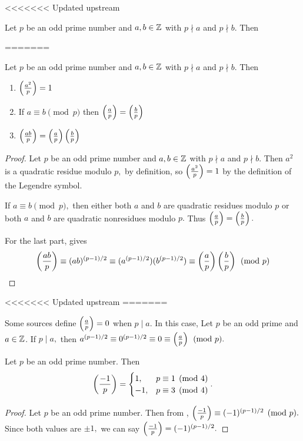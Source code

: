 \documentclass{ximera}
\begin{document}
<<<<<<< Updated upstream
\begin{proposition}[Proposition 4.5]\label{prop:legendre-facts}
	Let $p$ be an odd prime number and $a,b\in\mathbb Z$ with $p\nmid a$ and $p\nmid b.$ Then 
	\begin{enumerate}[label=(\alph*)]
=======
\begin{proposition}\label{prop:legendre-facts}
	Let $p$ be an odd prime number and $a,b\in\mathbb Z$ with $p\nmid a$ and $p\nmid b.$ Then 
	\begin{enumerate}
>>>>>>> Stashed changes
		\item $\left(\frac{a^2}{p}\right)=1$ \label{squares-are-square}
		\item If $a\equiv b\pmod{p}$ then $\left(\frac{a}{p}\right)=\left(\frac{b}{p}\right)$ \label{legendre-respects-mod}
		\item $\left(\frac{ab}{p}\right)=\left(\frac{a}{p}\right)\left(\frac{b}{p}\right)$ \label{legendre-mult}
	\end{enumerate}
\end{proposition}


\begin{proof}
    Let $p$ be an odd prime number and $a,b\in\mathbb Z$ with $p\nmid a$ and $p\nmid b.$ Then $a^2$ is a quadratic residue modulo $p,$ by definition, so $\left(\frac{a^2}{p}\right)=1$ by the definition of the Legendre symbol.

    If $a\equiv b\pmod{p},$ then either both $a$ and $b$ are quadratic residues modulo $p$ or both $a$ and $b$ are quadratic nonresidues modulo $p.$ Thus $\left(\frac{a}{p}\right)=\left(\frac{b}{p}\right).$

    For the last part,  gives \[\left(\frac{ab}{p}\right)\equiv (ab)^{(p-1)/2}\equiv (a^{(p-1)/2})(b^{(p-1)/2})\equiv \left(\frac{a}{p}\right)\left(\frac{b}{p}\right)\pmod{p}\]
\end{proof}

<<<<<<< Updated upstream
=======
\begin{remark}
	Some sources define $\left(\frac{a}{p}\right)=0$ when $p\mid a.$ In this case,  Let $p$ be an odd prime and $a\in\mathbb Z$.
	If $p\mid a,$ then $a^{(p-1)/2}\equiv 0^{(p-1)/2}\equiv 0\equiv\left(\frac{a}{p}\right)\pmod{p}.$
\end{remark}


\begin{theorem}\label{thm:residue-neg1}
	Let $p$ be an odd prime number. Then 
	\[
		\left(\frac{-1}{p}\right)=
			\begin{cases}
 				1, & p\equiv 1\pmod{4}\\
				-1, & p\equiv 3\pmod{4}
			\end{cases}.
	\]
	\begin{proof}
		Let $p$ be an odd prime number. Then from , $\left(\frac{-1}{p}\right)\equiv (-1)^{(p-1)/2}\pmod{p}.$ Since both values are $\pm1,$ we can say $\left(\frac{-1}{p}\right)=(-1)^{(p-1)/2}.$
	

\end{proof}
\end{theorem}
\end{enumerate}
\end{proposition}
\end{document}

